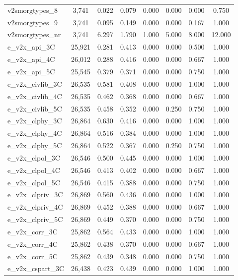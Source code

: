 \begin{table}[!htbp]
\begin{tabular}{@{\extracolsep{5pt}}lccccccc}
v2smorgtypes\_8 & 3,741 & 0.022 & 0.079 & 0.000 & 0.000 & 0.000 & 0.750 \\ 
v2smorgtypes\_9 & 3,741 & 0.095 & 0.149 & 0.000 & 0.000 & 0.167 & 1.000 \\ 
v2smorgtypes\_nr & 3,741 & 6.297 & 1.790 & 1.000 & 5.000 & 8.000 & 12.000 \\ 
e\_v2x\_api\_3C & 25,921 & 0.281 & 0.413 & 0.000 & 0.000 & 0.500 & 1.000 \\ 
e\_v2x\_api\_4C & 26,012 & 0.288 & 0.416 & 0.000 & 0.000 & 0.667 & 1.000 \\ 
e\_v2x\_api\_5C & 25,545 & 0.379 & 0.371 & 0.000 & 0.000 & 0.750 & 1.000 \\ 
e\_v2x\_civlib\_3C & 26,535 & 0.581 & 0.408 & 0.000 & 0.000 & 1.000 & 1.000 \\ 
e\_v2x\_civlib\_4C & 26,535 & 0.462 & 0.368 & 0.000 & 0.000 & 0.667 & 1.000 \\ 
e\_v2x\_civlib\_5C & 26,535 & 0.458 & 0.352 & 0.000 & 0.250 & 0.750 & 1.000 \\ 
e\_v2x\_clphy\_3C & 26,864 & 0.630 & 0.416 & 0.000 & 0.000 & 1.000 & 1.000 \\ 
e\_v2x\_clphy\_4C & 26,864 & 0.516 & 0.384 & 0.000 & 0.000 & 1.000 & 1.000 \\ 
e\_v2x\_clphy\_5C & 26,864 & 0.522 & 0.367 & 0.000 & 0.250 & 0.750 & 1.000 \\ 
e\_v2x\_clpol\_3C & 26,546 & 0.500 & 0.445 & 0.000 & 0.000 & 1.000 & 1.000 \\ 
e\_v2x\_clpol\_4C & 26,546 & 0.413 & 0.402 & 0.000 & 0.000 & 0.667 & 1.000 \\ 
e\_v2x\_clpol\_5C & 26,546 & 0.415 & 0.388 & 0.000 & 0.000 & 0.750 & 1.000 \\ 
e\_v2x\_clpriv\_3C & 26,869 & 0.560 & 0.436 & 0.000 & 0.000 & 1.000 & 1.000 \\ 
e\_v2x\_clpriv\_4C & 26,869 & 0.452 & 0.388 & 0.000 & 0.000 & 0.667 & 1.000 \\ 
e\_v2x\_clpriv\_5C & 26,869 & 0.449 & 0.370 & 0.000 & 0.000 & 0.750 & 1.000 \\ 
e\_v2x\_corr\_3C & 25,862 & 0.564 & 0.433 & 0.000 & 0.000 & 1.000 & 1.000 \\ 
e\_v2x\_corr\_4C & 25,862 & 0.438 & 0.370 & 0.000 & 0.000 & 0.667 & 1.000 \\ 
e\_v2x\_corr\_5C & 25,862 & 0.439 & 0.348 & 0.000 & 0.000 & 0.750 & 1.000 \\ 
e\_v2x\_cspart\_3C & 26,438 & 0.423 & 0.439 & 0.000 & 0.000 & 1.000 & 1.000 \\ 

\end{tabular}
\end{table}
